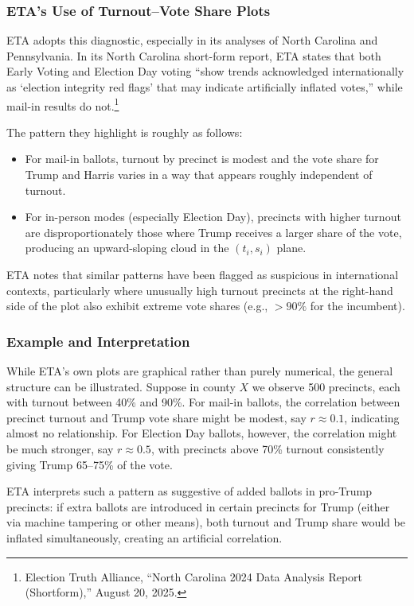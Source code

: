 \documentclass[12pt]{article}
\begin{document}
\subsubsection{ETA's Use of Turnout--Vote Share Plots}

ETA adopts this diagnostic, especially in its analyses of North Carolina and Pennsylvania. In its North Carolina short-form report, ETA states that both Early Voting and Election Day voting \enquote{show trends acknowledged internationally as `election integrity red flags' that may indicate artificially inflated votes,} while mail-in results do not.\footnote{Election Truth Alliance, ``North Carolina 2024 Data Analysis Report (Shortform),'' August 20, 2025.}

The pattern they highlight is roughly as follows:

\begin{itemize}
    \item For mail-in ballots, turnout by precinct is modest and the vote share for Trump and Harris varies in a way that appears roughly independent of turnout.
    \item For in-person modes (especially Election Day), precincts with higher turnout are disproportionately those where Trump receives a larger share of the vote, producing an upward-sloping cloud in the $(t_i, s_i)$ plane.
\end{itemize}

ETA notes that similar patterns have been flagged as suspicious in international contexts, particularly where unusually high turnout precincts at the right-hand side of the plot also exhibit extreme vote shares (e.g., $>90\%$ for the incumbent).

\subsubsection{Example and Interpretation}

While ETA's own plots are graphical rather than purely numerical, the general structure can be illustrated. Suppose in county $X$ we observe 500 precincts, each with turnout between 40\% and 90\%. For mail-in ballots, the correlation between precinct turnout and Trump vote share might be modest, say $r \approx 0.1$, indicating almost no relationship. For Election Day ballots, however, the correlation might be much stronger, say $r \approx 0.5$, with precincts above 70\% turnout consistently giving Trump 65--75\% of the vote.

ETA interprets such a pattern as suggestive of added ballots in pro-Trump precincts: if extra ballots are introduced in certain precincts for Trump (either via machine tampering or other means), both turnout and Trump share would be inflated simultaneously, creating an artificial correlation.
\end{document}
